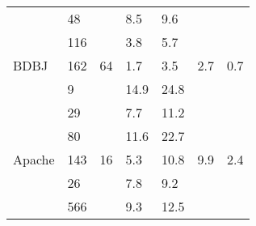 \begin{table*}[]
\begin{tabular}{|l|l|l|ll|l|l|}
                                   & 48                                           &                                            & \multicolumn{1}{l|}{\cellcolor[HTML]{C0C0C0}8.5}  & \cellcolor[HTML]{C0C0C0}9.6  &                       &                       \\ \cline{2-2} \cline{4-5}
                                   & 116                                          &                                            & \multicolumn{1}{l|}{\cellcolor[HTML]{C0C0C0}3.8}  & \cellcolor[HTML]{C0C0C0}5.7  &                       &                       \\ \cline{2-2} \cline{4-5}
\multirow{-4}{*}{BDBJ}             & 162                                          & \multirow{-4}{*}{64}                       & \multicolumn{1}{l|}{1.7}                          & 3.5                          & \multirow{-4}{*}{2.7} & \multirow{-4}{*}{0.7} \\ \hline
                                   & 9                                            &                                            & \multicolumn{1}{l|}{\cellcolor[HTML]{C0C0C0}14.9} & \cellcolor[HTML]{C0C0C0}24.8 &                       &                       \\ \cline{2-2} \cline{4-5}
                                   & 29                                           &                                            & \multicolumn{1}{l|}{\cellcolor[HTML]{C0C0C0}7.7}  & \cellcolor[HTML]{C0C0C0}11.2 &                       &                       \\ \cline{2-2} \cline{4-5}
                                   & 80                                           &                                            & \multicolumn{1}{l|}{\cellcolor[HTML]{C0C0C0}11.6} & \cellcolor[HTML]{C0C0C0}22.7 &                       &                       \\ \cline{2-2} \cline{4-5}
\multirow{-4}{*}{Apache}           & 143                                          & \multirow{-4}{*}{16}                       & \multicolumn{1}{l|}{5.3}                          & 10.8                         & \multirow{-4}{*}{9.9} & \multirow{-4}{*}{2.4} \\ \hline
                                   & 26                                           &                                            & \multicolumn{1}{l|}{\cellcolor[HTML]{C0C0C0}7.8}  & \cellcolor[HTML]{C0C0C0}9.2  &                       &                       \\ \cline{2-2} \cline{4-5}
                                   & 566                                          &                                            & \multicolumn{1}{l|}{\cellcolor[HTML]{C0C0C0}9.3}  & \cellcolor[HTML]{C0C0C0}12.5 &                       &                       \\ \cline{2-2} \cline{4-5}

\end{tabular}
\end{table*}

